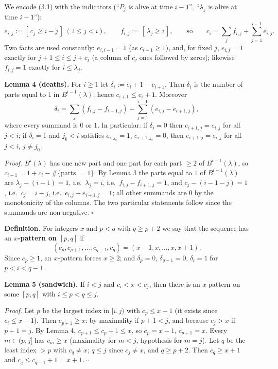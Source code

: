 \documentclass[11pt,a4paper]{article}
\begin{document}
We encode (3.1) with the indicators (``\(P_j\) is alive at time
\(i-1\)'', ``\(\lambda_j\) is alive at time \(i-1\)''):
\[e_{i,j}:=[\,c_j\ge i-j\,]\ (1\le j<i),\qquad f_{i,j}:=[\,\lambda_j\ge i\,],\qquad\text{so}\qquad c_i=\sum_{j}f_{i,j}+\sum_{j=1}^{i-1}e_{i,j}.\tag{3.2}\]
Two facts are used constantly: \(e_{i,i-1}=1\) (as \(c_{i-1}\ge1\)),
and, for fixed \(j\), \(e_{i,j}=1\) exactly for \(j+1\le i\le j+c_j\) (a
column of \(c_j\) ones followed by zeros); likewise \(f_{i,j}=1\)
exactly for \(i\le\lambda_j\).

\textbf{Lemma 4 (deaths).} For \(i\ge1\) let
\(\delta_i:=c_i+1-c_{i+1}\). Then \(\delta_i\) is the number of parts
equal to \(1\) in \(B^{i-1}(\lambda)\); hence \(c_{i+1}\le c_i+1\).
Moreover
\[\delta_i=\sum_j (f_{i,j}-f_{i+1,j})+\sum_{j=1}^{i-1}(e_{i,j}-e_{i+1,j}),\]
where every summand is \(0\) or \(1\). In particular: if \(\delta_i=0\)
then \(e_{i+1,j}=e_{i,j}\) for all \(j<i\); if \(\delta_i=1\) and
\(j_0<i\) satisfies \(e_{i,j_0}=1\), \(e_{i+1,j_0}=0\), then
\(e_{i+1,j}=e_{i,j}\) for all \(j<i\), \(j\ne j_0\).

\emph{Proof.} \(B^{i}(\lambda)\) has one new part and one part for each
part \(\ge2\) of \(B^{i-1}(\lambda)\), so
\(c_{i+1}=1+c_i-\#\{\text{parts }=1\}\). By Lemma 3 the parts equal to
\(1\) of \(B^{i-1}(\lambda)\) are \(\lambda_j-(i-1)=1\),
i.e.~\(\lambda_j=i\), i.e.~\(f_{i,j}-f_{i+1,j}=1\), and
\(c_j-(i-1-j)=1\), i.e.~\(c_j=i-j\), i.e.~\(e_{i,j}-e_{i+1,j}=1\); all
other summands are \(0\) by the monotonicity of the columns. The two
particular statements follow since the summands are non-negative.
\(\square\)

\textbf{Definition.} For integers \(x\) and \(p<q\) with \(q\ge p+2\) we
say that the sequence has an \textbf{\(x\)-pattern on \([p,q]\)} if
\[(c_p,c_{p+1},\dots,c_{q-1},c_q)=(x-1,x,\dots,x,x+1).\] Since
\(c_p\ge1\), an \(x\)-pattern forces \(x\ge2\); and \(\delta_p=0\),
\(\delta_{q-1}=0\), \(\delta_i=1\) for \(p<i<q-1\).

\textbf{Lemma 5 (sandwich).} If \(i<j\) and \(c_i<x<c_j\), then there is
an \(x\)-pattern on some \([p,q]\) with \(i\le p<q\le j\).

\emph{Proof.} Let \(p\) be the largest index in \([i,j)\) with
\(c_p\le x-1\) (it exists since \(c_i\le x-1\)). Then \(c_{p+1}\ge x\):
by maximality if \(p+1<j\), and because \(c_j>x\) if \(p+1=j\). By Lemma
4, \(c_{p+1}\le c_p+1\le x\), so \(c_p=x-1\), \(c_{p+1}=x\). Every
\(m\in(p,j]\) has \(c_m\ge x\) (maximality for \(m<j\), hypothesis for
\(m=j\)). Let \(q\) be the least index \(>p\) with \(c_q\ne x\);
\(q\le j\) since \(c_j\ne x\), and \(q\ge p+2\). Then \(c_q\ge x+1\) and
\(c_q\le c_{q-1}+1=x+1\). \(\square\)
\end{document}
